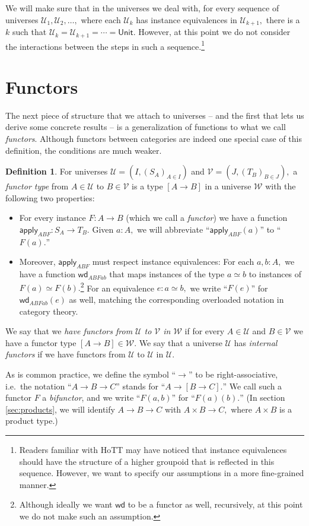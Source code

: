 \documentclass[a4paper]{article}
\theoremstyle{definition}
\newtheorem{definition}{Definition}[section]
\theoremstyle{remark}
\newcommand{\defn}{\emph}
\renewcommand{\equiv}{\simeq}
\newcommand{\U}{\mathcal{U}}
\newcommand{\V}{\mathcal{V}}
\newcommand{\W}{\mathcal{W}}
\newcommand{\nm}{\mathsf}
\newcommand{\universe}{\nm}
\newcommand{\Unit}{\universe{Unit}}
\newcommand{\apply}{\nm{apply}}
\newcommand{\congrArg}{\nm{wd}}
\begin{document}
We will make sure that in the universes we deal with, for every sequence of universes
$\U_1, \U_2, \ldots,$ where each $\U_k$ has instance equivalences in $\U_{k+1},$ there is
a $k$ such that $\U_k = \U_{k+1} = \cdots = \Unit.$ However, at this point we do not consider
the interactions between the steps in such a sequence.\footnote{Readers familiar with HoTT may
have noticed that instance equivalences should have the structure of a higher groupoid that is
reflected in this sequence. However, we want to specify our assumptions in a more fine-grained
manner.}

\section{Functors}
\label{sec:functors}

The next piece of structure that we attach to universes -- and the first that lets us derive
some concrete results -- is a generalization of functions to what we call \defn{functors}.
Although functors between categories are indeed one special case of this definition, the
conditions are much weaker.

\begin{definition}
  For universes $\U = (I, (S_A)_{A \in I})$ and $\V = (J, (T_B)_{B \in J}),$ a
  \defn{functor type} from $A \in \U$ to $B \in \V$ is a type $[A \to B]$ in a universe $\W$
  with the following two properties:
  \begin{itemize}
    \item For every instance $F : A \to B$ (which we call a \defn{functor}) we have a
    function $\apply_{ABF} : S_A \to T_B.$ Given $a : A,$ we will abbreviate
    ``$\apply_{ABF}(a)$'' to ``$F(a).$''
    \item Moreover, $\apply_{ABF}$ must respect instance equivalences: For each
    $a,b : A,$ we have a function $\congrArg_{ABFab}$ that maps instances of the type
    $a \equiv b$ to instances of $F(a) \equiv F(b).$\footnote{Although ideally we want
    $\congrArg$ to be a functor as well, recursively, at this point we do not make such an
    assumption.}
    For an equivalence $e : a \equiv b,$ we write ``$F(e)$'' for $\congrArg_{ABFab}(e)$ as
    well, matching the corresponding overloaded notation in category theory.
  \end{itemize}
  
  We say that we \defn{have functors from $\U$ to $\V$ in $\W$} if for every $A \in \U$ and
  $B \in \V$ we have a functor type $[A \to B] \in \W.$
  We say that a universe $\U$ has \defn{internal functors} if we have functors from $\U$ to
  $\U$ in $\U.$

  As is common practice, we define the symbol ``$\to$'' to be right-associative, i.e.\ the
  notation ``$A \to B \to C$'' stands for ``$A \to [B \to C].$'' We call such a functor $F$ a
  \defn{bifunctor}, and we write ``$F(a,b)$'' for ``$F(a)(b).$'' (In section \ref{sec:products},
  we will identify $A \to B \to C$ with $A \times B \to C,$ where $A \times B$ is a product
  type.)
\end{definition}
\end{document}
